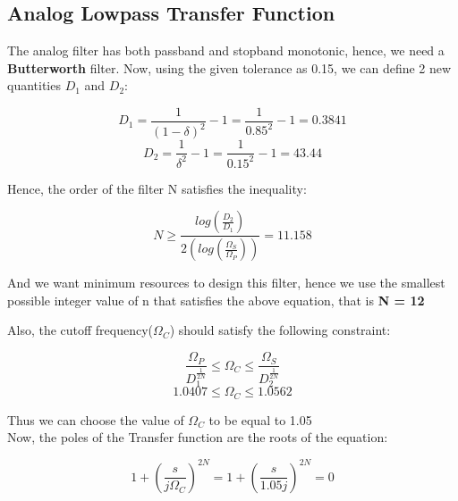 \documentclass{article}
\begin{document}
\subsection{Analog Lowpass Transfer Function}

The analog filter has both passband and stopband monotonic, hence, we need a \textbf{Butterworth} filter. Now, using the given tolerance as 0.15, we can define 2 new quantities $D_1$ and $D_2$:

\begin{center}
    \begin{equation*}
        D_1 = \frac{1}{(1-\delta)^2} - 1 = \frac{1}{0.85^2} - 1 = 0.3841
    \end{equation*}
    \begin{equation*}
        D_2 = \frac{1}{\delta^2} - 1 = \frac{1}{0.15^2} - 1 = 43.44
    \end{equation*}
\end{center}

Hence, the order of the filter N satisfies the inequality:
\begin{center}
    \begin{equation*}
        N \geq \frac{log(\frac{D_2}{D_1})}{2(log(\frac{\Omega_S}{\Omega_P}))} = 11.158
    \end{equation*}
\end{center}

And we want minimum resources to design this filter, hence we use the smallest possible integer value of n that satisfies the above equation, that is \textbf{N = 12}

Also, the cutoff frequency($\Omega_C$) should satisfy the following constraint:

\begin{center}
    \begin{equation*}
        \frac{\Omega_P}{D_1^{\frac{1}{2N}}} \leq \Omega_C \leq \frac{\Omega_S}{D_2^{\frac{1}{2N}}}
    \end{equation*}
    \begin{equation*}
        1.0407 \leq \Omega_C \leq 1.0562
    \end{equation*}
\end{center}

Thus we can choose the value of $\Omega_C$ to be equal to 1.05\\
Now, the poles of the Transfer function are the roots of the equation:
\begin{center}
    \begin{equation*}
        1 + (\frac{s}{j\Omega_C})^{2N} = 1 + (\frac{s}{1.05j})^{2N} = 0
    \end{equation*}
\end{center}
\end{document}
